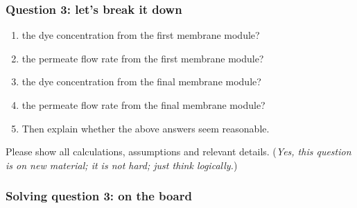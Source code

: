 \begin{frame}\frametitle{Question 3: let's break it down}
	\begin{enumerate}
		\item	the dye concentration from the first membrane module?
		\item	the permeate flow rate from the first membrane module?
		\item	the dye concentration from the final membrane module?
		\item	the permeate flow rate from the final membrane module?
		\item	Then explain whether the above answers seem reasonable.
	\end{enumerate}
	Please show all calculations, assumptions and relevant details. (\emph{Yes, this question is on new material; it is not hard; just think logically.})
\end{frame}

\begin{frame}\frametitle{Solving question 3: on the board}
	
\end{frame}
